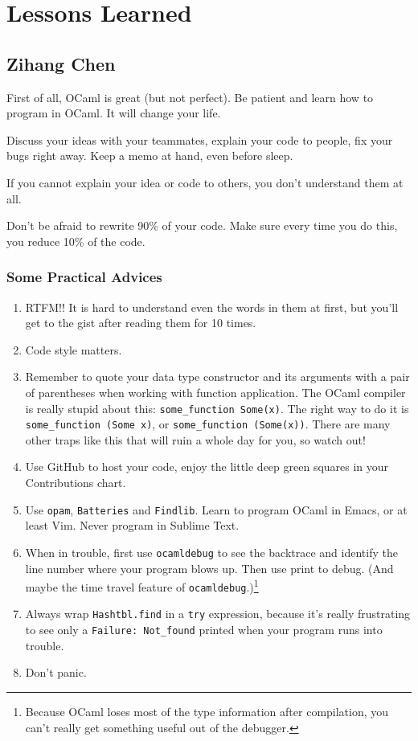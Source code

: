 \documentclass{report}
\begin{document}
\chapter{Lessons Learned}

\section{Zihang Chen}

First of all, OCaml is great (but not perfect). Be patient and learn how to program in OCaml. It will change your life.

Discuss your ideas with your teammates, explain your code to people, fix your bugs right away. Keep a memo at hand, even before sleep.

If you cannot explain your idea or code to others, you don't understand them at all.

Don't be afraid to rewrite 90\% of your code. Make sure every time you do this, you reduce 10\% of the code.

\subsection{Some Practical Advices}
\begin{enumerate}
\item RTFM!! It is hard to understand even the words in them at first, but you'll get to the gist after reading them for 10 times.

\item Code style matters.

\item Remember to quote your data type constructor and its arguments with a pair of parentheses when working with function application. The OCaml compiler is really stupid about this: \texttt{some\_function Some(x)}. The right way to do it is \texttt{some\_function (Some x)}, or \texttt{some\_function (Some(x))}. There are many other traps like this that will ruin a whole day for you, so watch out!

\item Use GitHub to host your code, enjoy the little deep green squares in your Contributions chart.

\item Use \texttt{opam}, \texttt{Batteries} and \texttt{Findlib}. Learn to program OCaml in Emacs, or at least Vim. Never program in Sublime Text.

\item When in trouble, first use \texttt{ocamldebug} to see the backtrace and identify the line number where your program blows up. Then use print to debug. (And maybe the time travel feature of \texttt{ocamldebug}.)\footnote{Because OCaml loses most of the type information after compilation, you can't really get something useful out of the debugger.}

\item Always wrap \texttt{Hashtbl.find} in a \texttt{try} expression, because it's really frustrating to see only a \texttt{Failure: Not\_found} printed when your program runs into trouble.

\item Don't panic.
\end{enumerate}
\end{document}
